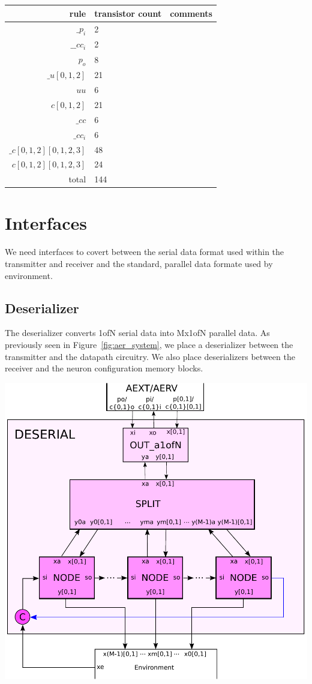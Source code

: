\documentclass{article}
\begin{document}
\begin{center}
    \begin{tabular}{|r|l|l|}
    \hline
    rule & transistor count & comments \\ \hline
    $\_p_i$ & 2 & \\ \hline
    $\_\_cc_i$ & 2 & \\ \hline
    $p_o$ & 8 & \\ \hline
    $\_u[0,1,2]$ & 21 & \\ \hline
    $uu$ & 6 & \\ \hline
    $c[0,1,2]$ & 21 & \\ \hline
    $\_cc$ & 6 & \\ \hline
    $\_cc_i$ & 6 & \\ \hline
    $\_c[0,1,2][0,1,2,3]$ & 48 & \\ \hline
    $c[0,1,2][0,1,2,3]$ &  24 & \\ \hline
    \hline total & 144 & \\ \hline
    \end{tabular}
\end{center}

\section{Interfaces}

We need interfaces to covert between the serial data format used within the transmitter
and receiver and the standard, parallel data formate used by environment.

\subsection{Deserializer \label{sec:DESERIAL}}

The deserializer converts 1ofN serial data into Mx1ofN parallel data.
As previously seen in Figure~\ref{fig:aer_system}, we place a deserializer 
between the transmitter and the datapath circuitry. We also place deserializers
between the receiver and the neuron configuration memory blocks.

\begin{center}
  \includegraphics[width=.45\textwidth]{img/deserial.pdf}
\end{center}
\end{document}
